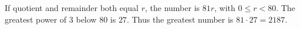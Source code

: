 If quotient and remainder both equal $r$, the number is $81r$, with $0\le r<80$. The greatest power of $3$ below $80$ is $27$. Thus the greatest number is $81\cdot27=\boxed{2187}$.
